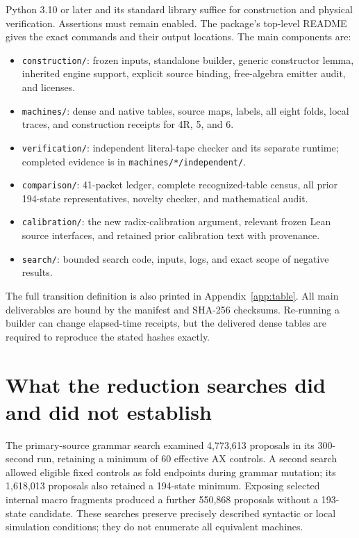 \documentclass[10pt,letterpaper]{article}
\newcommand{\file}[1]{\nolinkurl{#1}}
\begin{document}
Python 3.10 or later and its standard library suffice for construction and physical verification. Assertions must remain enabled. The package's top-level README gives the exact commands and their output locations. The main components are:
\begin{itemize}
\item \file{construction/}: frozen inputs, standalone builder, generic constructor lemma, inherited engine support, explicit source binding, free-algebra emitter audit, and licenses.
\item \file{machines/}: dense and native tables, source maps, labels, all eight folds, local traces, and construction receipts for 4R, 5, and 6.
\item \file{verification/}: independent literal-tape checker and its separate runtime; completed evidence is in \file{machines/*/independent/}.
\item \file{comparison/}: 41-packet ledger, complete recognized-table census, all prior 194-state representatives, novelty checker, and mathematical audit.
\item \file{calibration/}: the new radix-calibration argument, relevant frozen Lean source interfaces, and retained prior calibration text with provenance.
\item \file{search/}: bounded search code, inputs, logs, and exact scope of negative results.
\end{itemize}

The full transition definition is also printed in Appendix~\ref{app:table}. All main deliverables are bound by the manifest and SHA-256 checksums. Re-running a builder can change elapsed-time receipts, but the delivered dense tables are required to reproduce the stated hashes exactly.

\section{What the reduction searches did and did not establish}

The primary-source grammar search examined 4,773,613 proposals in its 300-second run, retaining a minimum of 60 effective AX controls. A second search allowed eligible fixed controls as fold endpoints during grammar mutation; its 1,618,013 proposals also retained a 194-state minimum. Exposing selected internal macro fragments produced a further 550,868 proposals without a 193-state candidate. These searches preserve precisely described syntactic or local simulation conditions; they do not enumerate all equivalent machines.
\end{document}
